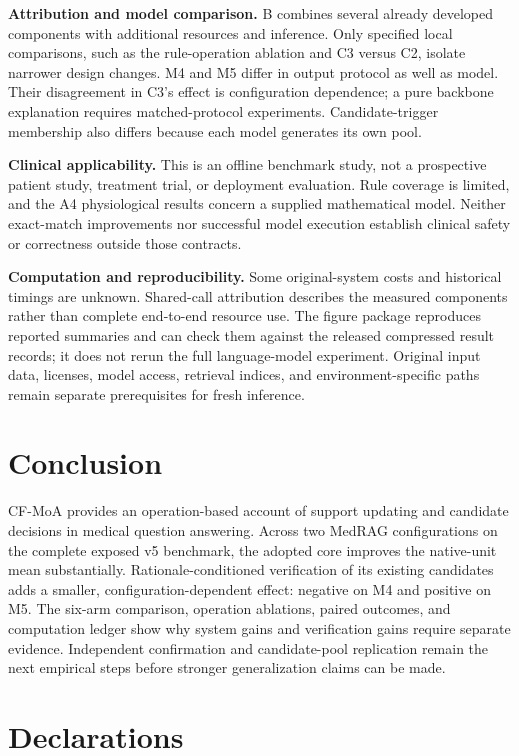 \documentclass[
  english,
  11pt,
]{article}
\begin{document}
\textbf{Attribution and model comparison.} B combines several already
developed components with additional resources and inference. Only
specified local comparisons, such as the rule-operation ablation and C3
versus C2, isolate narrower design changes. M4 and M5 differ in output
protocol as well as model. Their disagreement in C3's effect is
configuration dependence; a pure backbone explanation requires
matched-protocol experiments. Candidate-trigger membership also differs
because each model generates its own pool.

\textbf{Clinical applicability.} This is an offline benchmark study, not
a prospective patient study, treatment trial, or deployment evaluation.
Rule coverage is limited, and the A4 physiological results concern a
supplied mathematical model. Neither exact-match improvements nor
successful model execution establish clinical safety or correctness
outside those contracts.

\textbf{Computation and reproducibility.} Some original-system costs and
historical timings are unknown. Shared-call attribution describes the
measured components rather than complete end-to-end resource use. The
figure package reproduces reported summaries and can check them against
the released compressed result records; it does not rerun the full
language-model experiment. Original input data, licenses, model access,
retrieval indices, and environment-specific paths remain separate
prerequisites for fresh inference.

\section{Conclusion}\label{conclusion}

CF-MoA provides an operation-based account of support updating and
candidate decisions in medical question answering. Across two MedRAG
configurations on the complete exposed v5 benchmark, the adopted core
improves the native-unit mean substantially. Rationale-conditioned
verification of its existing candidates adds a smaller,
configuration-dependent effect: negative on M4 and positive on M5. The
six-arm comparison, operation ablations, paired outcomes, and
computation ledger show why system gains and verification gains require
separate evidence. Independent confirmation and candidate-pool
replication remain the next empirical steps before stronger
generalization claims can be made.

\section*{Declarations}\label{declarations}
\end{document}
